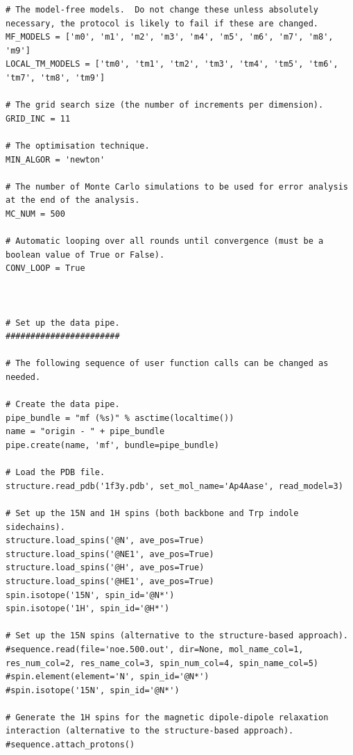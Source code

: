 \begin{htmlonly}
\begin{htmlonly}
\begin{lstlisting}
# The model-free models.  Do not change these unless absolutely necessary, the protocol is likely to fail if these are changed.
MF_MODELS = ['m0', 'm1', 'm2', 'm3', 'm4', 'm5', 'm6', 'm7', 'm8', 'm9']
LOCAL_TM_MODELS = ['tm0', 'tm1', 'tm2', 'tm3', 'tm4', 'tm5', 'tm6', 'tm7', 'tm8', 'tm9']

# The grid search size (the number of increments per dimension).
GRID_INC = 11

# The optimisation technique.
MIN_ALGOR = 'newton'

# The number of Monte Carlo simulations to be used for error analysis at the end of the analysis.
MC_NUM = 500

# Automatic looping over all rounds until convergence (must be a boolean value of True or False).
CONV_LOOP = True



# Set up the data pipe.
#######################

# The following sequence of user function calls can be changed as needed.

# Create the data pipe.
pipe_bundle = "mf (%s)" % asctime(localtime())
name = "origin - " + pipe_bundle
pipe.create(name, 'mf', bundle=pipe_bundle)

# Load the PDB file.
structure.read_pdb('1f3y.pdb', set_mol_name='Ap4Aase', read_model=3)

# Set up the 15N and 1H spins (both backbone and Trp indole sidechains).
structure.load_spins('@N', ave_pos=True)
structure.load_spins('@NE1', ave_pos=True)
structure.load_spins('@H', ave_pos=True)
structure.load_spins('@HE1', ave_pos=True)
spin.isotope('15N', spin_id='@N*')
spin.isotope('1H', spin_id='@H*')

# Set up the 15N spins (alternative to the structure-based approach).
#sequence.read(file='noe.500.out', dir=None, mol_name_col=1, res_num_col=2, res_name_col=3, spin_num_col=4, spin_name_col=5)
#spin.element(element='N', spin_id='@N*')
#spin.isotope('15N', spin_id='@N*')

# Generate the 1H spins for the magnetic dipole-dipole relaxation interaction (alternative to the structure-based approach).
#sequence.attach_protons()


\end{lstlisting}
\end{htmlonly}
\end{htmlonly}
